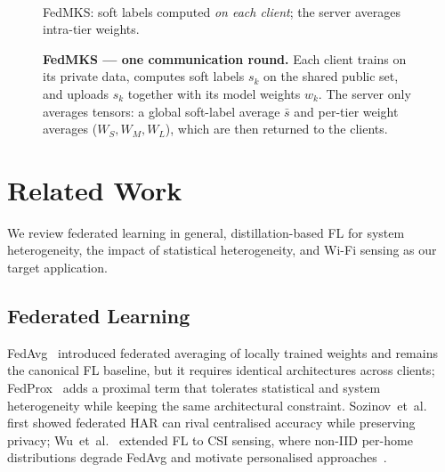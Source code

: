 \documentclass[conference]{IEEEtran}
\begin{document}
\begin{figure}[t]
\begin{minipage}[t]{0.72\textwidth}
{%
  }\\[1pt]
  {\footnotesize FedMKS: soft labels computed \emph{on each client};
   the server averages intra-tier weights.}
\end{minipage}
\caption{\textbf{FedMKS --- one communication round.}
  Each client trains on its private data, computes soft labels $s_k$
  on the shared public set, and uploads $s_k$ together with its model
  weights $w_k$.  The server only averages tensors: a global soft-label
  average $\bar s$ and per-tier weight averages ($W_S,W_M,W_L$), which
  are then returned to the clients.}
\label{fig:fedmksoverview}
\end{figure}

\section{Related Work}
\label{sec:related}

We review federated learning in general, distillation-based FL for
system heterogeneity, the impact of statistical heterogeneity, and
Wi-Fi sensing as our target application.

\subsection{Federated Learning}

FedAvg~\cite{mcmahan2017fedavg} introduced federated averaging of
locally trained weights and remains the canonical FL baseline, but it
requires identical architectures across clients;
FedProx~\cite{li2020fedprox} adds a proximal term that tolerates
statistical and system heterogeneity while keeping the same
architectural constraint.  Sozinov~et~al.~\cite{sozinov2018fedhar}
first showed federated HAR can rival centralised accuracy while
preserving privacy; Wu~et~al.~\cite{wu2021fedcsi} extended FL to CSI
sensing, where non-IID per-home distributions degrade FedAvg and
motivate personalised
approaches~\cite{ek2020fedwifi,ouyang2021clusterfl,presotto2022semfed}.
\end{document}
